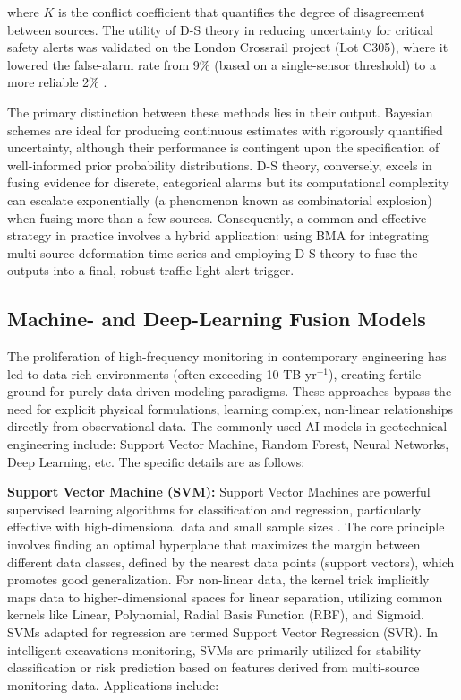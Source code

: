 \documentclass[preprint,11pt,authoryear,3p]{elsarticle}
\begin{document}
where $K$ is the conflict coefficient that quantifies the degree of disagreement between sources. The utility of D-S theory in reducing uncertainty for critical safety alerts was validated on the London Crossrail project (Lot C305), where it lowered the false-alarm rate from 9\% (based on a single-sensor threshold) to a more reliable 2\% \citep{Zhang2023review}.

The primary distinction between these methods lies in their output. Bayesian schemes are ideal for producing continuous estimates with rigorously quantified uncertainty, although their performance is contingent upon the specification of well-informed prior probability distributions. D-S theory, conversely, excels in fusing evidence for discrete, categorical alarms but its computational complexity can escalate exponentially (a phenomenon known as combinatorial explosion) when fusing more than a few sources. Consequently, a common and effective strategy in practice involves a hybrid application: using BMA for integrating multi-source deformation time-series and employing D-S theory to fuse the outputs into a final, robust traffic-light alert trigger.


\subsection{Machine- and Deep-Learning Fusion Models}
\label{subsec:ml}

The proliferation of high-frequency monitoring in contemporary engineering has led to data-rich environments (often exceeding 10 TB yr$^{-1}$), creating fertile ground for purely data-driven modeling paradigms. These approaches bypass the need for explicit physical formulations, learning complex, non-linear relationships directly from observational data. The commonly used AI models in geotechnical engineering include: Support Vector Machine, Random Forest, Neural Networks, Deep Learning, etc. The specific details are as follows:

\textbf{Support Vector Machine (SVM): } Support Vector Machines are powerful supervised learning algorithms for classification and regression, particularly effective with high-dimensional data and small sample sizes \citep{Murphy2022Intro}. The core principle involves finding an optimal hyperplane that maximizes the margin between different data classes, defined by the nearest data points (support vectors), which promotes good generalization. For non-linear data, the kernel trick implicitly maps data to higher-dimensional spaces for linear separation, utilizing common kernels like Linear, Polynomial, Radial Basis Function (RBF), and Sigmoid. SVMs adapted for regression are termed Support Vector Regression (SVR). In intelligent excavations monitoring, SVMs are primarily utilized for stability classification or risk prediction based on features derived from multi-source monitoring data. Applications include:
\end{document}
